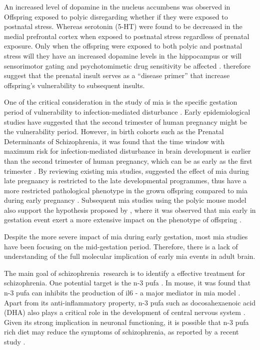 \documentclass[12pt]{scrbook}
\newcommand*{\scz}{schizophrenia}
\newcommand*{\Scz}{Schizophrenia}
\begin{document}
An increased level of dopamine in the nucleus accumbens was observed in Offspring exposed to \gls{polyic} disregarding whether if they were exposed to postnatal stress.
Whereas serotonin (5-HT) were found to be decreased in the medial prefrontal cortex when exposed to postnatal stress regardless of prenatal exposure.
Only when the offspring were exposed to both \gls{polyic} and postnatal stress will they have an increased dopamine levels in the hippocampus or will sensorimotor gating and psychotomimetic drug sensitivity be affected \citep{Giovanoli2013}.
\citet{Giovanoli2013} therefore suggest that the prenatal insult serves as a ``disease primer'' that increase offspring's vulnerability to subsequent insults.

One of the critical consideration in the study of \gls{mia} is the specific gestation period of vulnerability to infection-mediated disturbance \citep{Meyer2007a}.
Early epidemiological studies have suggested that the second trimester of human pregnancy might be the vulnerability period.
However, in birth cohorts such as the Prenatal Determinants of \Scz, it was found that the time window with maximum risk for infection-mediated disturbance in brain development is earlier than the second trimester of human pregnancy, which can be as early as the first trimester \citep{Meyer2007a}.
By reviewing existing \gls{mia} studies, \citet{Meyer2007a} suggested the effect of \gls{mia} during late pregnancy is restricted to the late developmental programmes, thus have a more restricted pathological phenotype in the grown offspring compared to \gls{mia} during early pregnancy \citep{Meyer2007a}.
Subsequent \gls{mia} studies using the \gls{polyic} mouse model also support the hypothesis proposed by \citet{Meyer2007a}, where it was observed that \gls{mia} early in gestation event exert a more extensive impact on the phenotype of offspring \citep{Li2009c,Li2010a}.
	
Despite the more severe impact of \gls{mia} during early gestation, most \gls{mia} studies have been focusing on the mid-gestation period.
Therefore, there is a lack of understanding of the full molecular implication of early \gls{mia} events in adult brain.

The main goal of \scz\ research is to identify a effective treatment for \scz. 
One potential target is the n-3 \gls{pufa} \citep{Li2015,Trebble2003}.
In mouse, it was found that n-3 \gls{pufa} can inhibits the production of \gls{il6} \citep{Trebble2003} - a major mediator in \gls{mia} model \citep{Smith2007}.
Apart from its anti-inflammatory property, n-3 \gls{pufa} such as docosahexaenoic acid (DHA) also plays a critical role in the development of central nervous system \citep{Clandinin1999,Kitajka2002}.
Given its strong implication in neuronal functioning, it is possible that n-3 \gls{pufa} rich diet may reduce the symptoms of \scz, as reported by a recent study \citep{Li2015}.
\end{document}
